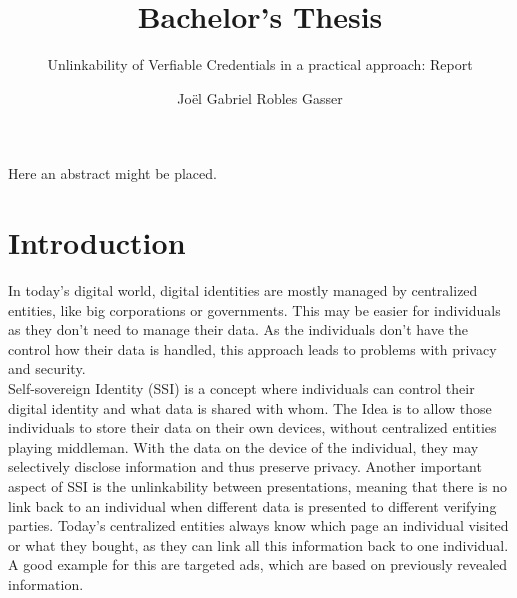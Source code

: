 \documentclass[
	a4paper               %
	,BCOR=0mm            %
	,bibliography=totoc   %
	,listof=totoc         %
	,monolingual
	,twoside=false
]{bfhthesis}              %
\begin{document}
\frontmatter

\title{Bachelor's Thesis}
\subtitle{Unlinkability of Verfiable Credentials in a practical approach: Report}
\author{Joël Gabriel Robles Gasser}

\maketitle

Here an abstract might be placed.


\tableofcontents

\mainmatter

\chapter{Introduction}
In today's digital world, digital identities are mostly managed by centralized entities, like big corporations or governments. This may be easier for individuals as they don't need to manage their data. As the individuals don't have the control how their data is handled, this approach leads to problems with privacy and security. \\

Self-sovereign Identity (SSI)\cite{self-sovereign-identity} is a concept where individuals can control their digital identity and what data is shared with whom. The Idea is to allow those individuals to store their data on their own devices, without centralized entities playing middleman. With the data on the device of the individual, they may selectively disclose information and thus preserve privacy. Another important aspect of SSI is the unlinkability between presentations, meaning that there is no link back to an individual when different data is presented to different verifying parties. Today's centralized entities always know which page an individual visited or what they bought, as they can link all this information back to one individual. A good example for this are targeted ads, which are based on previously revealed information. \\
\end{document}
